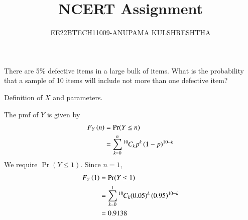 \documentclass[journal,11pt,twocolumn]{IEEEtran}
\begin{document}
\let\vec\mathbf
\vspace{3cm}
\title{NCERT Assignment}
\author{EE22BTECH11009-ANUPAMA KULSHRESHTHA}
\maketitle
\bigskip

There are 5\% defective items in a large bulk of items. What is the probability that a sample of 10 items will include not more than one defective item?

\solution

\begin{table}[!ht]
\centering

\caption{Definition of $X$ and parameters.}
\label{tab:ncert/12/13/5/3/}
\end{table}

The pmf of $Y$ is given by  
    \begin{align}
        F_Y\left(n\right) &= \Pr(Y \leq n) \\
                    &= \sum_{k=0}^n{{}^{10}\mkern-1muC_{k}}p^k\left(1-p\right)^{10-k}
    \end{align}
  We require $\Pr(Y \leq 1)$. Since $n = 1$,
             \begin{align}
                F_Y\left(1\right) &= \Pr(Y \leq 1) \\
                &=  \sum_{k=0}^1{{}^{10}\mkern-1muC_{k}}(0.05)^k\left(0.95\right)^{10-k} \\
                           &= 0.9138 
             \end{align} 
\end{document}
